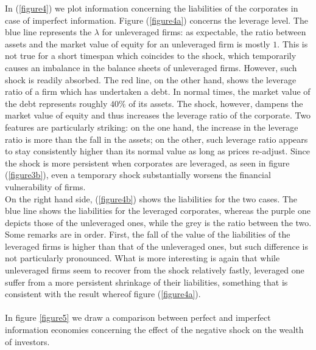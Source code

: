 \documentclass[11pt]{article}
\begin{document}
In (\ref{figure4}) we plot information concerning the liabilities of the corporates in case of imperfect information. Figure (\ref{figure4a}) concerns the leverage level. The blue line represents the $\lambda$ for unleveraged firms: as expectable, the ratio between assets and the market value of equity for an unleveraged firm is mostly $1$. This is not true for a short timespan which coincides to the shock, which temporarily causes an imbalance in the balance sheets of unleveraged firms. However, such shock is readily absorbed. The red line, on the other hand, shows the leverage ratio of a firm which has undertaken a debt. In normal times, the market value of the debt represents roughly $40\%$ of its assets. The shock, however, dampens the market value of equity and thus increases the leverage ratio of the corporate. Two features are particularly striking: on the one hand, the increase in the leverage ratio is more than the fall in the assets; on the other, such leverage ratio appears to stay consistently higher than its normal value as long as prices re-adjust. Since the shock is more persistent when corporates are leveraged, as seen in figure (\ref{figure3b}), even a temporary shock substantially worsens the financial vulnerability of firms.\\
On the right hand side, (\ref{figure4b}) shows the liabilities for the two cases. The blue line shows the liabilities for the leveraged corporates, whereas the purple one depicts those of the unleveraged ones, while the grey is the ratio between the two. Some remarks are in order. First, the fall of the value of the liabilities of the leveraged firms is higher than that of the unleveraged ones, but such difference is not particularly pronounced. What is more interesting is again that while unleveraged firms seem to recover from the shock relatively fastly, leveraged one suffer from a more persistent shrinkage of their liabilities, something that is consistent with the result whereof figure (\ref{figure4a}).\\\\
In figure \ref{figure5} we draw a comparison between perfect and imperfect information economies concerning the effect of the negative shock on the wealth of investors.
\end{document}
